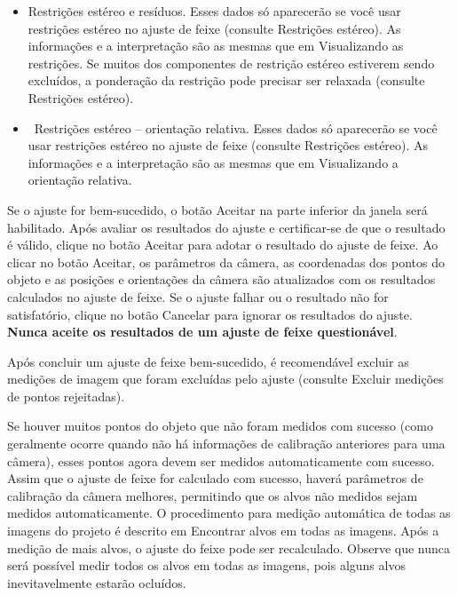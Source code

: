 \documentclass[
  12pt,
  letterpaper,
  DIV=11,
  numbers=noendperiod]{scrreprt}
\providecommand{\tightlist}{%
  \setlength{\itemsep}{0pt}\setlength{\parskip}{0pt}}
\begin{document}
\begin{itemize}
\tightlist
\item
  Restrições estéreo e resíduos. Esses dados só aparecerão se você usar
  restrições estéreo no ajuste de feixe (consulte Restrições estéreo).
  As informações e a interpretação são as mesmas que em Visualizando as
  restrições. Se muitos dos componentes de restrição estéreo estiverem
  sendo excluídos, a ponderação da restrição pode precisar ser relaxada
  (consulte Restrições estéreo).
\end{itemize}

\begin{itemize}
\tightlist
\item
  ~Restrições estéreo -- orientação relativa. Esses dados só aparecerão
  se você usar restrições estéreo no ajuste de feixe (consulte
  Restrições estéreo). As informações e a interpretação são as mesmas
  que em Visualizando a orientação relativa.
\end{itemize}

Se o ajuste for bem-sucedido, o botão Aceitar na parte inferior da
janela será habilitado. Após avaliar os resultados do ajuste e
certificar-se de que o resultado é válido, clique no botão Aceitar para
adotar o resultado do ajuste de feixe. Ao clicar no botão Aceitar, os
parâmetros da câmera, as coordenadas dos pontos do objeto e as posições
e orientações da câmera são atualizados com os resultados calculados no
ajuste de feixe. Se o ajuste falhar ou o resultado não for satisfatório,
clique no botão Cancelar para ignorar os resultados do ajuste.
\textbf{Nunca aceite os resultados de um ajuste de feixe questionável}.

Após concluir um ajuste de feixe bem-sucedido, é recomendável excluir as
medições de imagem que foram excluídas pelo ajuste (consulte Excluir
medições de pontos rejeitadas).

Se houver muitos pontos do objeto que não foram medidos com sucesso
(como geralmente ocorre quando não há informações de calibração
anteriores para uma câmera), esses pontos agora devem ser medidos
automaticamente com sucesso. Assim que o ajuste de feixe for calculado
com sucesso, haverá parâmetros de calibração da câmera melhores,
permitindo que os alvos não medidos sejam medidos automaticamente. O
procedimento para medição automática de todas as imagens do projeto é
descrito em Encontrar alvos em todas as imagens. Após a medição de mais
alvos, o ajuste do feixe pode ser recalculado. Observe que nunca será
possível medir todos os alvos em todas as imagens, pois alguns alvos
inevitavelmente estarão ocluídos.
\end{document}

